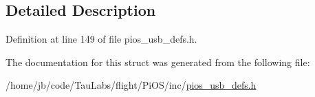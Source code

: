 \subsection{\-Detailed \-Description}


\-Definition at line 149 of file pios\-\_\-usb\-\_\-defs.\-h.



\-The documentation for this struct was generated from the following file\-:\begin{DoxyCompactItemize}
\item 
/home/jb/code/\-Tau\-Labs/flight/\-Pi\-O\-S/inc/\hyperlink{pios__usb__defs_8h}{pios\-\_\-usb\-\_\-defs.\-h}\end{DoxyCompactItemize}

